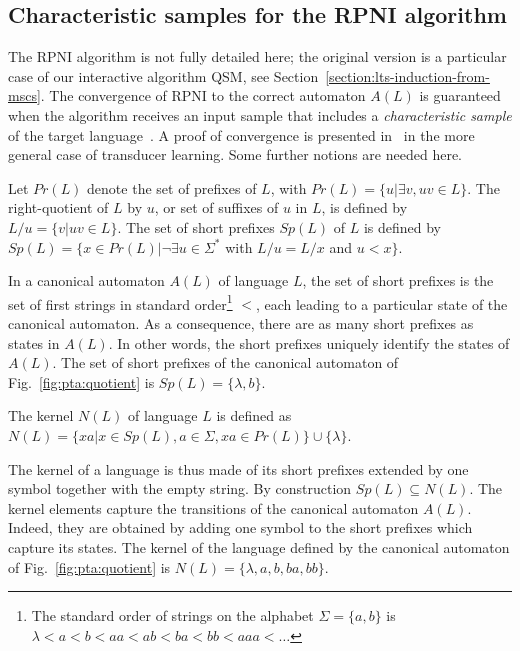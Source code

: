 \subsection{Characteristic samples for the RPNI algorithm\label{subsection:gi-background-rpni}}

The RPNI algorithm is not fully detailed here; the original version is a particular case of our interactive algorithm \textsc{QSM}, see Section~\ref{section:lts-induction-from-mscs}. The convergence of RPNI to the correct automaton $A(L)$ is guaranteed when the algorithm receives an input sample that includes a \textsl{characteristic sample} of the target language~\cite{Oncina:1992}. A proof of convergence is presented in~\cite{Oncina:1993} in the more general case of transducer learning. Some further notions are needed here.

\begin{definition} 
Let $Pr(L)$ denote the set of prefixes of $L$, with $Pr(L) = \{u | \exists v, uv \in L\}$. The right-quotient of $L$ by $u$, or set of suffixes of $u$ in $L$, is defined by $L/u = \{v | uv \in L\}$. The set of short prefixes $Sp(L)$ of $L$ is defined by $Sp(L) = \{x \in Pr(L) | \neg\exists u \in \Sigma^*$ with $L/u = L/x$ and $u < x\}$.
\end{definition}

In a canonical automaton $A(L)$ of language $L$, the set of short prefixes is the set of first strings in standard order\footnote{The standard order of strings on the alphabet $\Sigma=\{a,b\}$ is $\lambda < a < b < aa < ab < ba < bb < aaa < \ldots$} $<$, each leading to a particular state of the canonical automaton. As a consequence, there are as many short prefixes as states in $A(L)$. In other words, the short prefixes uniquely identify the states of $A(L)$. The set of short prefixes of the canonical automaton of Fig.~\ref{fig:pta:quotient} is $Sp(L) = \{\lambda, b\}$.

\begin{definition}
 The kernel $N(L)$ of language $L$ is defined as $N(L) = \{xa | x \in Sp(L), a \in \Sigma, xa \in Pr(L)\} \cup \{\lambda\}$.
\end{definition}

The kernel of a language is thus made of its short prefixes extended by one symbol together with the empty string. By construction $Sp(L) \subseteq N(L)$. The kernel elements capture the transitions of the canonical automaton $A(L)$. Indeed, they are obtained by adding one symbol to the short prefixes which capture its states. The kernel of the language defined by the canonical automaton of Fig.~\ref{fig:pta:quotient} is $N(L) = \{\lambda, a, b, ba, bb\}$.

